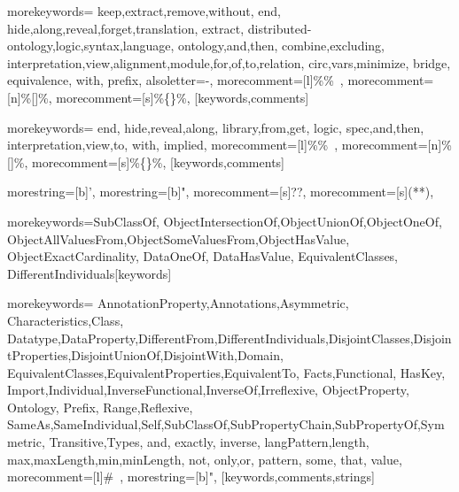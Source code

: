 %
{morekeywords={%
keep,extract,remove,without,%
end,%
hide,along,reveal,forget,translation,%
extract,%
distributed-ontology,logic,syntax,language,%
ontology,and,then,%
combine,excluding,%
interpretation,view,alignment,module,for,of,to,relation,%
circ,vars,minimize,%
bridge,%
equivalence,%
with,%
prefix},
alsoletter=-,%
morecomment=[l]{\%\%\ },%
morecomment=[n]{\%[}{]\%},%
morecomment=[s]{\%\{}{\}\%},%
}[keywords,comments]

%
{morekeywords={%
end,%
hide,reveal,along,%
library,from,get,%
logic,%
spec,and,then,%
interpretation,view,to,%
with,%
implied},
morecomment=[l]{\%\%\ },%
morecomment=[n]{\%[}{]\%},%
morecomment=[s]{\%\{}{\}\%},%
}[keywords,comments]

%
{morestring=[b]',%
morestring=[b]",%
morecomment=[s]{?}{?},%
morecomment=[s]{(*}{*)},%
}

%
{morekeywords={SubClassOf,%
ObjectIntersectionOf,ObjectUnionOf,ObjectOneOf,%
ObjectAllValuesFrom,ObjectSomeValuesFrom,ObjectHasValue,%
ObjectExactCardinality,%
DataOneOf,%
DataHasValue,%
EquivalentClasses,%
DifferentIndividuals}}[keywords]

%
{morekeywords={%
AnnotationProperty,Annotations,Asymmetric,%
Characteristics,Class,%
Datatype,DataProperty,DifferentFrom,DifferentIndividuals,DisjointClasses,DisjointProperties,DisjointUnionOf,DisjointWith,Domain,%
EquivalentClasses,EquivalentProperties,EquivalentTo,%
Facts,Functional,%
HasKey,%
Import,Individual,InverseFunctional,InverseOf,Irreflexive,%
ObjectProperty,%
Ontology,%
Prefix,%
Range,Reflexive,%
SameAs,SameIndividual,Self,SubClassOf,SubPropertyChain,SubPropertyOf,Symmetric,%
Transitive,Types,%
and,%
exactly,%
inverse,%
langPattern,length,%
max,maxLength,min,minLength,%
not,%
only,or,%
pattern,%
some,%
that,%
value},%
morecomment=[l]{\#\ },%
morestring=[b]",%
}[keywords,comments,strings]


